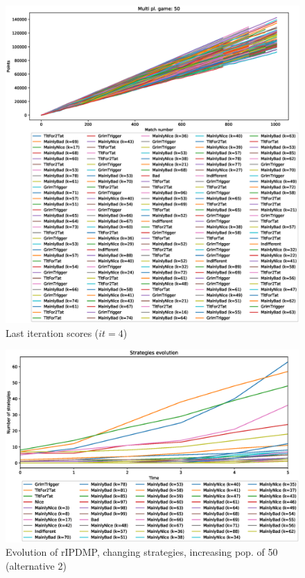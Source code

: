 \documentclass[journal,10pt,twoside]{IEEEtran}
\begin{document}
\begin{figure}[!ht]
    \centering
    \includegraphics[width=1\columnwidth]{../img/cipdmp-incr/alt1/cipdmp-scores-increasing-pop-50-r4}
    \caption{Last iteration scores ($it=4$)}
    \label{fig:incrCLI}
\end{figure}


\begin{figure}[!ht]
    \centering
    \includegraphics[width=1\columnwidth]{../img/cipdmp-incr/alt2/cipdmp-evolution-increasing-pop-50}
    \caption{Evolution of rIPDMP, changing strategies, increasing pop. of 50 (alternative 2)}
    \label{fig:incrC2}
\end{figure}
\end{document}
